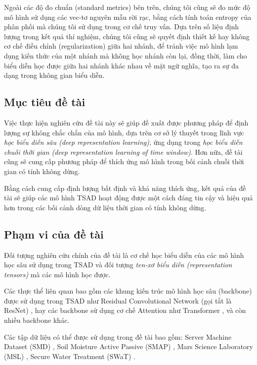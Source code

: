 {Ngoài các độ đo chuẩn (standard metrics) bên trên, chúng tôi cũng sẽ đo mức độ mô hình sử dụng các vec-tơ nguyên mẫu rời rạc, bằng cách tính toán entropy của phân phối mà chúng tôi sử dụng trong cơ chế truy vấn. Dựa trên số liệu định lượng trong kết quả thí nghiệm, chúng tôi cũng sẽ quyết định thiết kế hay không cơ chế điều chỉnh (regularization) giữa hai nhánh, để tránh việc mô hình lạm dụng kiến thức của một nhánh mà không học nhánh còn lại, đồng thời, làm cho biểu diễn học được giữa hai nhánh khác nhau về mặt ngữ nghĩa, tạo ra sự đa dạng trong không gian biểu diễn.

\subsection{Mục tiêu đề tài}
Việc thực hiện nghiên cứu đề tài này sẽ giúp đề xuất được phương pháp để định lượng sự không chắc chắn của mô hình, dựa trên cơ sở lý thuyết trong lĩnh vực \textit{học biểu diễn sâu (deep representation learning)}, ứng dụng trong \textit{học biểu diễn chuỗi thời gian (deep representation learning of time window)}. Hơn nữa, đề tài cũng sẽ cung cấp phương pháp để thích ứng mô hình trong bối cảnh chuỗi thời gian có tính không dừng.

Bằng cách cung cấp định lượng bất định và khả năng thích ứng, kết quả của đề tài sẽ giúp các mô hình TSAD hoạt động được một cách đáng tin cậy và hiệu quả hơn trong các bối cảnh dòng dữ liệu thời gian có tính không dừng.

\subsection{Phạm vi của đề tài}

Đối tượng nghiên cứu chính của đề tài là cơ chế học biểu diễn của các mô hình học sâu sử dụng trong TSAD và đối tượng \textit{ten-xơ biểu diễn (representation tensors)} mà các mô hình học được.

Các thực thể liên quan bao gồm các khung kiến trúc mô hình học sâu (backbone) được sử dụng trong TSAD như Residual Convolutional Network (gọi tắt là ResNet) \cite{7780459}, hay các backbone sử dụng cơ chế Attention như Transformer \cite{10.5555/3295222.3295349}, và còn nhiều backbone khác.

Các tập dữ liệu có thể được sử dụng trong đề tài bao gồm: Server Machine Dataset (SMD) \cite{10.1145/3292500.3330672}, Soil Moisture Active Passive (SMAP) \cite{10.1145/3219819.3219845}, Mars Science Laboratory (MSL) \cite{10.1145/3219819.3219845}, Secure Water Treatment (SWaT) \cite{10.1007/978-3-319-71368-7_8}.

}
